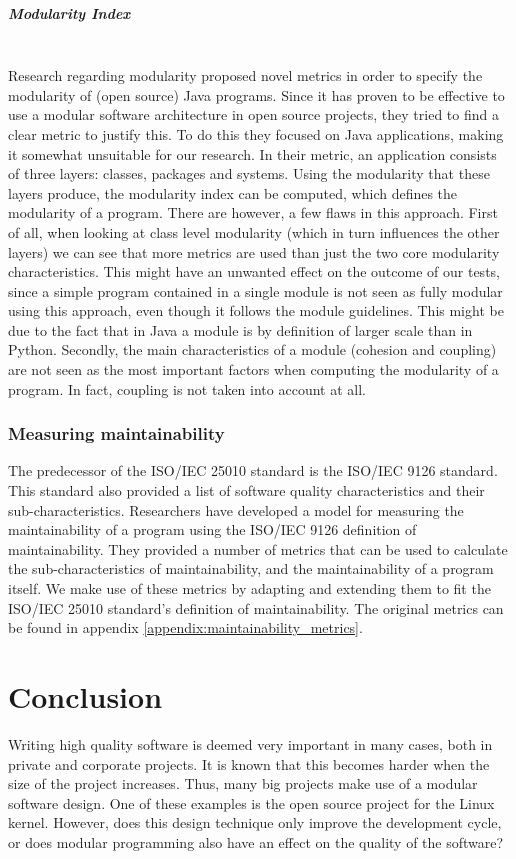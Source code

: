 \documentclass[twoside]{uva-inf-bachelor-thesis}
\newcommand{\myparagraph}[1]{\paragraph{#1}\mbox{}\\}
\begin{document}
\myparagraph{Modularity Index}
Research regarding modularity proposed novel metrics in order to specify the modularity of (open source) Java programs\cite{emanuel2013modularity}. Since it has proven  to be effective to use a modular software architecture in open source projects, they tried to find a clear metric to justify this. To do this they focused on Java applications, making it somewhat unsuitable for our research. In their metric, an application consists of three layers: classes, packages and systems. Using the modularity that these layers produce, the modularity index can be computed, which defines the modularity of a program. There are however, a few flaws in this approach. First of all, when looking at class level modularity (which in turn influences the other layers) we can see that more metrics are used than just the two core modularity characteristics. This might have an unwanted effect on the outcome of our tests, since a simple program contained in a single module is not seen as fully modular using this approach, even though it follows the module guidelines. This might be due to the fact that in Java a module is by definition of larger scale  than in Python. Secondly, the main characteristics of a module (cohesion and coupling) are not seen as the most important factors when computing the modularity of a program. In fact, coupling is not taken into account at all.

\subsection*{Measuring maintainability}
The predecessor of the ISO/IEC 25010 standard is the ISO/IEC 9126 standard\cite{ISO9126}. This standard also provided a list of software quality characteristics and their sub-characteristics. Researchers have developed a model for measuring the maintainability of a program using the ISO/IEC 9126 definition of maintainability\cite{heitlager2016practical}. They provided a number of metrics that can be used to calculate the sub-characteristics of maintainability, and the maintainability of a program itself. We make use of these metrics by adapting and extending them to fit the ISO/IEC 25010 standard's definition of maintainability. The original metrics can be found in appendix \ref{appendix:maintainability_metrics}.

\chapter{Conclusion}
Writing high quality software is deemed very important in many cases, both in private and corporate projects. It is known that this becomes harder when the size of the project increases\cite{bhatia2014survey,banker1993software}. Thus, many big projects make use of a modular software design. One of these examples is the open source project for the Linux kernel\cite{lee2000linux}. However, does this design technique only improve the development cycle, or does modular programming also have an effect on the quality of the software?\\
\end{document}
